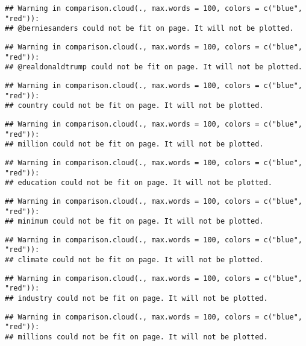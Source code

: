 \documentclass[]{article}
\begin{document}
\begin{verbatim}
## Warning in comparison.cloud(., max.words = 100, colors = c("blue", "red")):
## @berniesanders could not be fit on page. It will not be plotted.
\end{verbatim}

\begin{verbatim}
## Warning in comparison.cloud(., max.words = 100, colors = c("blue", "red")):
## @realdonaldtrump could not be fit on page. It will not be plotted.
\end{verbatim}

\begin{verbatim}
## Warning in comparison.cloud(., max.words = 100, colors = c("blue", "red")):
## country could not be fit on page. It will not be plotted.
\end{verbatim}

\begin{verbatim}
## Warning in comparison.cloud(., max.words = 100, colors = c("blue", "red")):
## million could not be fit on page. It will not be plotted.
\end{verbatim}

\begin{verbatim}
## Warning in comparison.cloud(., max.words = 100, colors = c("blue", "red")):
## education could not be fit on page. It will not be plotted.
\end{verbatim}

\begin{verbatim}
## Warning in comparison.cloud(., max.words = 100, colors = c("blue", "red")):
## minimum could not be fit on page. It will not be plotted.
\end{verbatim}

\begin{verbatim}
## Warning in comparison.cloud(., max.words = 100, colors = c("blue", "red")):
## climate could not be fit on page. It will not be plotted.
\end{verbatim}

\begin{verbatim}
## Warning in comparison.cloud(., max.words = 100, colors = c("blue", "red")):
## industry could not be fit on page. It will not be plotted.
\end{verbatim}

\begin{verbatim}
## Warning in comparison.cloud(., max.words = 100, colors = c("blue", "red")):
## millions could not be fit on page. It will not be plotted.
\end{verbatim}
\end{document}
